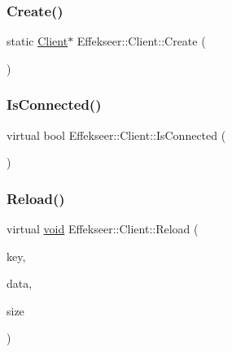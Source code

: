 \subsubsection{\texorpdfstring{Create()}{Create()}}
{\footnotesize\ttfamily static \mbox{\hyperlink{class_effekseer_1_1_client}{Client}}$\ast$ Effekseer\+::\+Client\+::\+Create (\begin{DoxyParamCaption}{ }\end{DoxyParamCaption})\hspace{0.3cm}{\ttfamily [static]}}

\mbox{\label{class_effekseer_1_1_client_a83c2f00111623d0fe4536a197b7ac9b7}} 
\subsubsection{\texorpdfstring{Is\+Connected()}{IsConnected()}}
{\footnotesize\ttfamily virtual bool Effekseer\+::\+Client\+::\+Is\+Connected (\begin{DoxyParamCaption}{ }\end{DoxyParamCaption})\hspace{0.3cm}{\ttfamily [pure virtual]}}

\mbox{\label{class_effekseer_1_1_client_a3c80e7d4534a6697e20fc222df7b4598}} 
\subsubsection{\texorpdfstring{Reload()}{Reload()}\hspace{0.1cm}{\footnotesize\ttfamily [1/2]}}
{\footnotesize\ttfamily virtual \mbox{\hyperlink{namespace_effekseer_ab34c4088e512200cf4c2716f168deb56}{void}} Effekseer\+::\+Client\+::\+Reload (\begin{DoxyParamCaption}\item[{const \mbox{\hyperlink{_effekseer_8h_aca7eb5de6dd019c19ac58ea35a193f2f}{E\+F\+K\+\_\+\+C\+H\+AR}} $\ast$}]{key,  }\item[{\mbox{\hyperlink{namespace_effekseer_ab34c4088e512200cf4c2716f168deb56}{void}} $\ast$}]{data,  }\item[{int32\+\_\+t}]{size }\end{DoxyParamCaption})\hspace{0.3cm}{\ttfamily [pure virtual]}}

